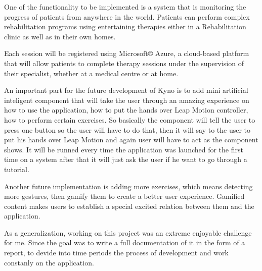 One of the functionality to be implemented is a system that is  monitoring the progress of patients from anywhere in the world. Patients can perform complex rehabilitation programs using entertaining therapies either in a Rehabilitation clinic as well as in their own homes.

Each session will be registered using Microsoft® Azure, a cloud-based platform that will allow patients to complete therapy sessions under the supervision of their specialist, whether at a medical centre or at home.

An important part for the future development of Kyno is to add mini artificial inteligent component that will take the user through an amazing experience on how to use the application, how to put the hands over Leap Motion controller, how to perform certain exercises. So basically the component will tell the user to press one button so the user will have to do that, then it will say to the user to put his hands over Leap Motion and again user will have to act as the component shows. It will be runned every time the application was launched for the first time on a system after that it will just ask the user if he want to go through a tutorial.

Another future implementation is adding more exercises, which means detecting more gestures, then gamify them to create a better user experience. Gamified content makes users to establish a special excited relation between them and the application.


As a generalization, working on this project was an extreme enjoyable challenge for me. Since  the goal was to  write a full documentation of it in the form of a report, to devide into time periods the process of development and work constanly on the application.


\clearpage